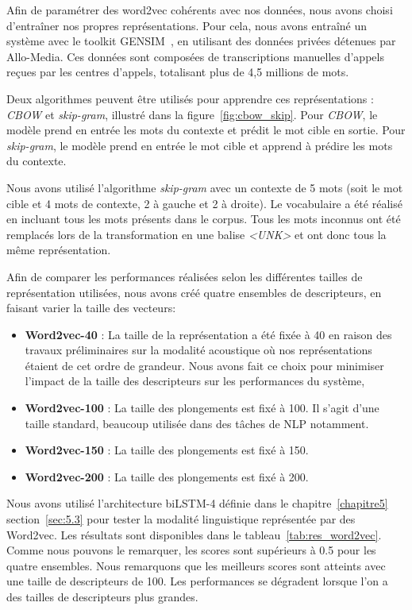 Afin de paramétrer des word2vec cohérents avec nos données, nous avons choisi d’entraîner nos propres représentations. Pour cela, nous avons entraîné un système avec le toolkit GENSIM~\cite{gensim}, en utilisant des données privées détenues par Allo-Media. Ces données sont composées de transcriptions manuelles d'appels reçues par les centres d'appels, totalisant plus de 4,5 millions de mots.

Deux algorithmes peuvent être utilisés pour apprendre ces représentations : \textit{CBOW} et \textit{skip-gram}, illustré dans la figure~\ref{fig:cbow_skip}. Pour \textit{CBOW}, le modèle prend en entrée les mots du contexte et prédit le mot cible en sortie. Pour \textit{skip-gram}, le modèle prend en entrée le mot cible et apprend à prédire les mots du contexte.



Nous avons utilisé l'algorithme \textit{skip-gram} avec un contexte de 5 mots (soit le mot cible et 4 mots de contexte, 2 à gauche et 2 à droite). Le vocabulaire a été réalisé en incluant tous les mots présents dans le corpus. Tous les mots inconnus ont été remplacés lors de la transformation en une balise \textit{<UNK>} et ont donc tous la même représentation.

Afin de comparer les performances réalisées selon les différentes tailles de représentation utilisées, nous avons créé quatre ensembles de descripteurs, en faisant varier la taille des vecteurs:
\begin{itemize}
  \item \textbf{Word2vec-40} : La taille de la représentation a été fixée à 40 en raison des travaux préliminaires sur la modalité acoustique où nos représentations étaient de cet ordre de grandeur. Nous avons fait ce choix pour minimiser l'impact de la taille des descripteurs sur les performances du système,
  \item \textbf{Word2vec-100} : La taille des plongements est fixé à 100. Il s'agit d'une taille standard, beaucoup utilisée dans des tâches de NLP notamment.
  \item \textbf{Word2vec-150} : La taille des plongements est fixé à 150.
  \item \textbf{Word2vec-200} : La taille des plongements est fixé à 200. %
\end{itemize}

Nous avons utilisé l'architecture biLSTM-4 définie dans le chapitre~\ref{chapitre5} section~\ref{sec:5.3} pour tester la modalité linguistique représentée par des Word2vec. Les résultats sont disponibles dans le tableau~\ref{tab:res_word2vec}. Comme nous pouvons le remarquer, les scores sont supérieurs à 0.5 pour les quatre ensembles. Nous remarquons que les meilleurs scores sont atteints avec une taille de descripteurs de 100. Les performances se dégradent lorsque l'on a des tailles de descripteurs plus grandes.


